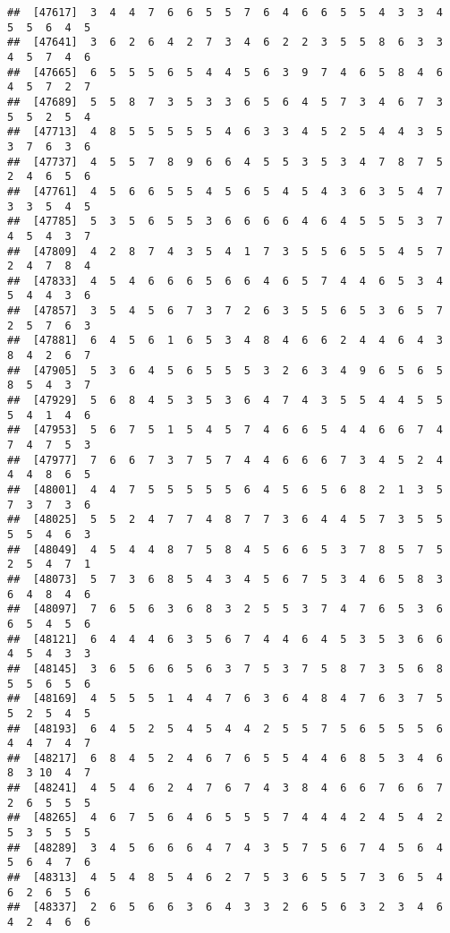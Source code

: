 \documentclass[
]{book}
\begin{document}
\begin{verbatim}
##  [47617]  3  4  4  7  6  6  5  5  7  6  4  6  6  5  5  4  3  3  4  5  5  6  4  5
##  [47641]  3  6  2  6  4  2  7  3  4  6  2  2  3  5  5  8  6  3  3  4  5  7  4  6
##  [47665]  6  5  5  5  6  5  4  4  5  6  3  9  7  4  6  5  8  4  6  4  5  7  2  7
##  [47689]  5  5  8  7  3  5  3  3  6  5  6  4  5  7  3  4  6  7  3  5  5  2  5  4
##  [47713]  4  8  5  5  5  5  5  4  6  3  3  4  5  2  5  4  4  3  5  3  7  6  3  6
##  [47737]  4  5  5  7  8  9  6  6  4  5  5  3  5  3  4  7  8  7  5  2  4  6  5  6
##  [47761]  4  5  6  6  5  5  4  5  6  5  4  5  4  3  6  3  5  4  7  3  3  5  4  5
##  [47785]  5  3  5  6  5  5  3  6  6  6  6  4  6  4  5  5  5  3  7  4  5  4  3  7
##  [47809]  4  2  8  7  4  3  5  4  1  7  3  5  5  6  5  5  4  5  7  2  4  7  8  4
##  [47833]  4  5  4  6  6  6  5  6  6  4  6  5  7  4  4  6  5  3  4  5  4  4  3  6
##  [47857]  3  5  4  5  6  7  3  7  2  6  3  5  5  6  5  3  6  5  7  2  5  7  6  3
##  [47881]  6  4  5  6  1  6  5  3  4  8  4  6  6  2  4  4  6  4  3  8  4  2  6  7
##  [47905]  5  3  6  4  5  6  5  5  5  3  2  6  3  4  9  6  5  6  5  8  5  4  3  7
##  [47929]  5  6  8  4  5  3  5  3  6  4  7  4  3  5  5  4  4  5  5  5  4  1  4  6
##  [47953]  5  6  7  5  1  5  4  5  7  4  6  6  5  4  4  6  6  7  4  7  4  7  5  3
##  [47977]  7  6  6  7  3  7  5  7  4  4  6  6  6  7  3  4  5  2  4  4  4  8  6  5
##  [48001]  4  4  7  5  5  5  5  5  6  4  5  6  5  6  8  2  1  3  5  7  3  7  3  6
##  [48025]  5  5  2  4  7  7  4  8  7  7  3  6  4  4  5  7  3  5  5  5  5  4  6  3
##  [48049]  4  5  4  4  8  7  5  8  4  5  6  6  5  3  7  8  5  7  5  2  5  4  7  1
##  [48073]  5  7  3  6  8  5  4  3  4  5  6  7  5  3  4  6  5  8  3  6  4  8  4  6
##  [48097]  7  6  5  6  3  6  8  3  2  5  5  3  7  4  7  6  5  3  6  6  5  4  5  6
##  [48121]  6  4  4  4  6  3  5  6  7  4  4  6  4  5  3  5  3  6  6  4  5  4  3  3
##  [48145]  3  6  5  6  6  5  6  3  7  5  3  7  5  8  7  3  5  6  8  5  5  6  5  6
##  [48169]  4  5  5  5  1  4  4  7  6  3  6  4  8  4  7  6  3  7  5  5  2  5  4  5
##  [48193]  6  4  5  2  5  4  5  4  4  2  5  5  7  5  6  5  5  5  6  4  4  7  4  7
##  [48217]  6  8  4  5  2  4  6  7  6  5  5  4  4  6  8  5  3  4  6  8  3 10  4  7
##  [48241]  4  5  4  6  2  4  7  6  7  4  3  8  4  6  6  7  6  6  7  2  6  5  5  5
##  [48265]  4  6  7  5  6  4  6  5  5  5  7  4  4  4  2  4  5  4  2  5  3  5  5  5
##  [48289]  3  4  5  6  6  6  4  7  4  3  5  7  5  6  7  4  5  6  4  5  6  4  7  6
##  [48313]  4  5  4  8  5  4  6  2  7  5  3  6  5  5  7  3  6  5  4  6  2  6  5  6
##  [48337]  2  6  5  6  6  3  6  4  3  3  2  6  5  6  3  2  3  4  6  4  2  4  6  6

\end{verbatim}
\end{document}
